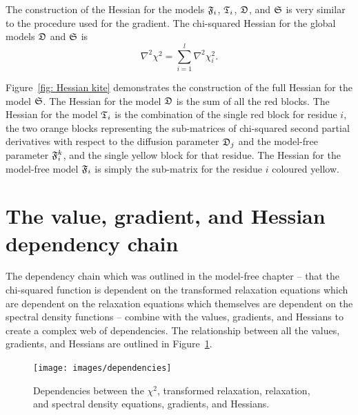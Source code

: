 The construction of the Hessian for the models $\mathfrak{F}_i$, $\mathfrak{T}_i$, $\mathfrak{D}$, and $\mathfrak{S}$ is very similar to the procedure used for the gradient.  The chi-squared Hessian for the global models $\mathfrak{D}$ and $\mathfrak{S}$ is
\begin{equation} \label{eq: spaceset Hessian}
    \nabla^2 \chi^2 = \sum_{i=1}^l \nabla^2 \chi^2_i.
\end{equation}

\noindent Figure~\ref{fig: Hessian kite} demonstrates the construction of the full Hessian for the model $\mathfrak{S}$.  The Hessian for the model $\mathfrak{D}$ is the sum of all the red blocks.  The Hessian for the model $\mathfrak{T}_i$ is the combination of the single red block for residue $i$, the two orange blocks representing the sub-matrices of chi-squared second partial derivatives with respect to the diffusion parameter $\mathfrak{D}_j$ and the model-free parameter $\mathfrak{F}_i^k$, and the single yellow block for that residue.  The Hessian for the model-free model $\mathfrak{F}_i$ is simply the sub-matrix for the residue $i$ coloured yellow.




\section{The value, gradient, and Hessian dependency chain}

The dependency chain which was outlined in the model-free chapter -- that the chi-squared function is dependent on the transformed relaxation equations which are dependent on the relaxation equations which themselves are dependent on the spectral density functions -- combine with the values, gradients, and Hessians to create a complex web of dependencies.  The relationship between all the values, gradients, and Hessians are outlined in Figure~\ref{fig: dependencies}.

\begin{figure}
\centerline{\texttt{[image: images/dependencies]}}
\caption[$\chi^2$ dependencies of the values, gradients, and Hessians.]{Dependencies between the $\chi^2$, transformed relaxation, relaxation, and spectral density equations, gradients, and Hessians.}\label{fig: dependencies}
\end{figure}




